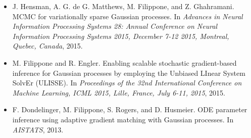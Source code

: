 \begin{itemize}
\item  J. Hensman, A. G. de G. Matthews, M. Filippone, and Z. Ghahramani. MCMC for variationally sparse Gaussian processes. In \emph{Advances in Neural Information Processing Systems 28: Annual Conference on Neural Information Processing Systems 2015, December 7-12 2015, Montreal, Quebec, Canada}, 2015.  
\item  M. Filippone and R. Engler. Enabling scalable stochastic gradient-based inference for Gaussian processes by employing the Unbiased LInear System SolvEr (ULISSE). In \emph{Proceedings of the 32nd International Conference on Machine Learning, ICML 2015, Lille, France, July 6-11, 2015}, 2015.  
\item  F. Dondelinger, M. Filippone, S. Rogers, and D. Husmeier. ODE parameter inference using adaptive gradient matching with Gaussian processes. In \emph{AISTATS}, 2013.  

\end{itemize}
